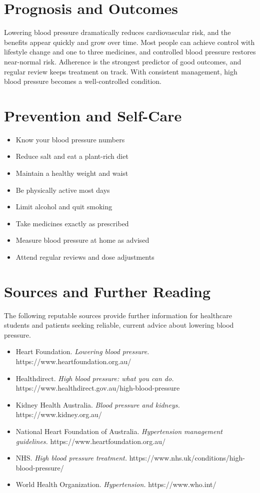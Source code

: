 \section*{Prognosis and Outcomes}
Lowering blood pressure dramatically reduces cardiovascular risk, and the benefits appear quickly and grow over time. Most people can achieve control with lifestyle change and one to three medicines, and controlled blood pressure restores near-normal risk. Adherence is the strongest predictor of good outcomes, and regular review keeps treatment on track. With consistent management, high blood pressure becomes a well-controlled condition.

\section*{Prevention and Self-Care}
\begin{itemize}
    \item Know your blood pressure numbers
    \item Reduce salt and eat a plant-rich diet
    \item Maintain a healthy weight and waist
    \item Be physically active most days
    \item Limit alcohol and quit smoking
    \item Take medicines exactly as prescribed
    \item Measure blood pressure at home as advised
    \item Attend regular reviews and dose adjustments
\end{itemize}

\section*{Sources and Further Reading}
The following reputable sources provide further information for healthcare students and patients seeking reliable, current advice about lowering blood pressure.

\begin{itemize}
    \item Heart Foundation. \textit{Lowering blood pressure.} https://www.heartfoundation.org.au/
    \item Healthdirect. \textit{High blood pressure: what you can do.} https://www.healthdirect.gov.au/high-blood-pressure
    \item Kidney Health Australia. \textit{Blood pressure and kidneys.} https://www.kidney.org.au/
    \item National Heart Foundation of Australia. \textit{Hypertension management guidelines.} https://www.heartfoundation.org.au/
    \item NHS. \textit{High blood pressure treatment.} https://www.nhs.uk/conditions/high-blood-pressure/
    \item World Health Organization. \textit{Hypertension.} https://www.who.int/
\end{itemize}
